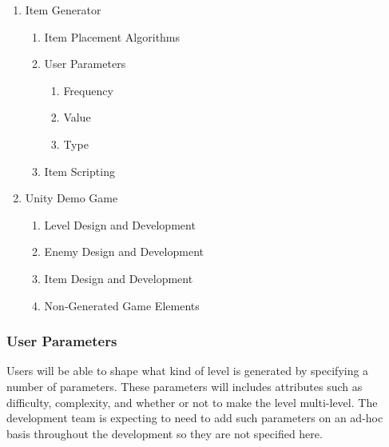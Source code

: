 \documentclass[pdftex,12pt,letter]{article}
\begin{document}
\begin{enumerate}
\item{Item Generator}
\begin{enumerate}
\item Item Placement Algorithms
\item User Parameters
\begin{enumerate}
\item Frequency
\item Value
\item Type
\end{enumerate}
\item Item Scripting
\end{enumerate}

\item{Unity Demo Game}
\begin{enumerate}
\item Level Design and Development
\item Enemy Design and Development
\item Item Design and Development
\item Non-Generated Game Elements
\end{enumerate}
\end{enumerate}

\subsubsection{User Parameters}
Users will be able to shape what kind of level is generated by specifying a number of parameters. These parameters will includes attributes such as difficulty, complexity, and whether or not to make the level multi-level. The development team is expecting to need to add such parameters on an ad-hoc basis throughout the development so they are not specified here.
\end{document}
